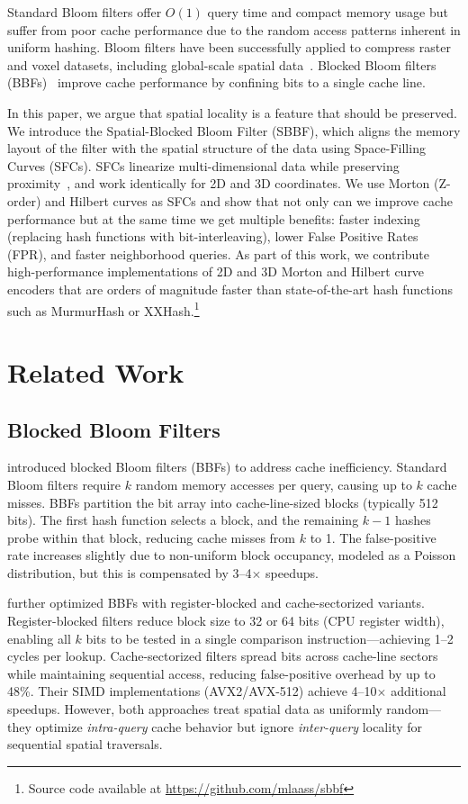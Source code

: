 \documentclass[conference,a4paper]{IEEEtran}
\begin{document}
Standard Bloom filters offer $O(1)$ query time and compact memory usage but suffer from poor cache performance due to the random access patterns inherent in uniform hashing. Bloom filters have been successfully applied to compress raster and voxel datasets, including global-scale spatial data~\citep{Werner2019,Werner2021}. Blocked Bloom filters (BBFs)~\citep{Putze2009} improve cache performance by confining bits to a single cache line.

In this paper, we argue that spatial locality is a feature that should be preserved. We introduce the Spatial-Blocked Bloom Filter (SBBF), which aligns the memory layout of the filter with the spatial structure of the data using Space-Filling Curves (SFCs). SFCs linearize multi-dimensional data while preserving proximity~\citep{Morton1966}, and work identically for 2D and 3D coordinates.
We use Morton (Z-order) and Hilbert curves as SFCs and show that not only can we improve cache performance but at the same time we get multiple benefits: faster indexing (replacing hash functions with bit-interleaving), lower False Positive Rates (FPR), and faster neighborhood queries. As part of this work, we contribute high-performance implementations of 2D and 3D Morton and Hilbert curve encoders that are orders of magnitude faster than state-of-the-art hash functions such as MurmurHash or XXHash.\footnote{Source code available at \url{https://github.com/mlaass/sbbf}}

\section{Related Work}
\subsection{Blocked Bloom Filters}
\citet{Putze2009} introduced blocked Bloom filters (BBFs) to address cache inefficiency. Standard Bloom filters require $k$ random memory accesses per query, causing up to $k$ cache misses. BBFs partition the bit array into cache-line-sized blocks (typically 512 bits). The first hash function selects a block, and the remaining $k-1$ hashes probe within that block, reducing cache misses from $k$ to 1. The false-positive rate increases slightly due to non-uniform block occupancy, modeled as a Poisson distribution, but this is compensated by 3--4$\times$ speedups.

\citet{Lang2019} further optimized BBFs with register-blocked and cache-sectorized variants. Register-blocked filters reduce block size to 32 or 64 bits (CPU register width), enabling all $k$ bits to be tested in a single comparison instruction---achieving 1--2 cycles per lookup. Cache-sectorized filters spread bits across cache-line sectors while maintaining sequential access, reducing false-positive overhead by up to 48\%. Their SIMD implementations (AVX2/AVX-512) achieve 4--10$\times$ additional speedups. However, both approaches treat spatial data as uniformly random---they optimize \emph{intra-query} cache behavior but ignore \emph{inter-query} locality for sequential spatial traversals.
\end{document}

